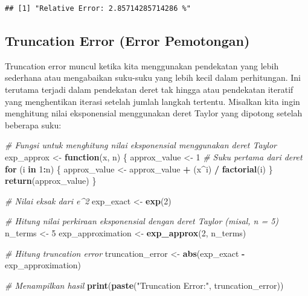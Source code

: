 \documentclass[
]{book}
\newenvironment{Shaded}{\begin{snugshade}}{\end{snugshade}}
\newcommand{\CommentTok}[1]{\textcolor[rgb]{0.56,0.35,0.01}{\textit{#1}}}
\newcommand{\ControlFlowTok}[1]{\textcolor[rgb]{0.13,0.29,0.53}{\textbf{#1}}}
\newcommand{\DecValTok}[1]{\textcolor[rgb]{0.00,0.00,0.81}{#1}}
\newcommand{\FunctionTok}[1]{\textcolor[rgb]{0.13,0.29,0.53}{\textbf{#1}}}
\newcommand{\NormalTok}[1]{#1}
\newcommand{\OtherTok}[1]{\textcolor[rgb]{0.56,0.35,0.01}{#1}}
\newcommand{\SpecialCharTok}[1]{\textcolor[rgb]{0.81,0.36,0.00}{\textbf{#1}}}
\newcommand{\StringTok}[1]{\textcolor[rgb]{0.31,0.60,0.02}{#1}}
\theoremstyle{definition}
\theoremstyle{definition}
\theoremstyle{definition}
\theoremstyle{definition}
\theoremstyle{remark}
\begin{document}
\begin{verbatim}
## [1] "Relative Error: 2.85714285714286 %"
\end{verbatim}

\hypertarget{truncation-error-error-pemotongan}{%
\subsection{Truncation Error (Error Pemotongan)}\label{truncation-error-error-pemotongan}}

Truncation error muncul ketika kita menggunakan pendekatan yang lebih sederhana atau mengabaikan suku-suku yang lebih kecil dalam perhitungan. Ini terutama terjadi dalam pendekatan deret tak hingga atau pendekatan iteratif yang menghentikan iterasi setelah jumlah langkah tertentu. Misalkan kita ingin menghitung nilai eksponensial menggunakan deret Taylor yang dipotong setelah beberapa suku:

\begin{Shaded}
\begin{Highlighting}[]
\CommentTok{\# Fungsi untuk menghitung nilai eksponensial menggunakan deret Taylor}
\NormalTok{exp\_approx }\OtherTok{\textless{}{-}} \ControlFlowTok{function}\NormalTok{(x, n) \{}
\NormalTok{  approx\_value }\OtherTok{\textless{}{-}} \DecValTok{1}  \CommentTok{\# Suku pertama dari deret}
  \ControlFlowTok{for}\NormalTok{ (i }\ControlFlowTok{in} \DecValTok{1}\SpecialCharTok{:}\NormalTok{n) \{}
\NormalTok{    approx\_value }\OtherTok{\textless{}{-}}\NormalTok{ approx\_value }\SpecialCharTok{+}\NormalTok{ (x}\SpecialCharTok{\^{}}\NormalTok{i) }\SpecialCharTok{/} \FunctionTok{factorial}\NormalTok{(i)}
\NormalTok{  \}}
  \FunctionTok{return}\NormalTok{(approx\_value)}
\NormalTok{\}}

\CommentTok{\# Nilai eksak dari e\^{}2}
\NormalTok{exp\_exact }\OtherTok{\textless{}{-}} \FunctionTok{exp}\NormalTok{(}\DecValTok{2}\NormalTok{)}

\CommentTok{\# Hitung nilai perkiraan eksponensial dengan deret Taylor (misal, n = 5)}
\NormalTok{n\_terms }\OtherTok{\textless{}{-}} \DecValTok{5}
\NormalTok{exp\_approximation }\OtherTok{\textless{}{-}} \FunctionTok{exp\_approx}\NormalTok{(}\DecValTok{2}\NormalTok{, n\_terms)}

\CommentTok{\# Hitung truncation error}
\NormalTok{truncation\_error }\OtherTok{\textless{}{-}} \FunctionTok{abs}\NormalTok{(exp\_exact }\SpecialCharTok{{-}}\NormalTok{ exp\_approximation)}

\CommentTok{\# Menampilkan hasil}
\FunctionTok{print}\NormalTok{(}\FunctionTok{paste}\NormalTok{(}\StringTok{"Truncation Error:"}\NormalTok{, truncation\_error))}
\end{Highlighting}
\end{Shaded}
\end{document}
